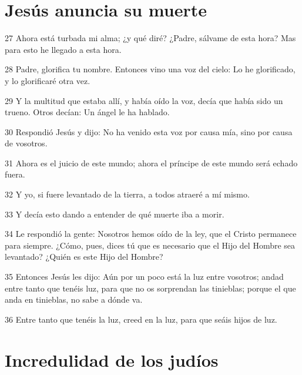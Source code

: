 \section*{Jesús anuncia su muerte}

\par 27 Ahora está turbada mi alma; ¿y qué diré? ¿Padre, sálvame de esta hora? Mas para esto he llegado a esta hora.
\par 28 Padre, glorifica tu nombre. Entonces vino una voz del cielo: Lo he glorificado, y lo glorificaré otra vez.
\par 29 Y la multitud que estaba allí, y había oído la voz, decía que había sido un trueno. Otros decían: Un ángel le ha hablado.
\par 30 Respondió Jesús y dijo: No ha venido esta voz por causa mía, sino por causa de vosotros.
\par 31 Ahora es el juicio de este mundo; ahora el príncipe de este mundo será echado fuera.
\par 32 Y yo, si fuere levantado de la tierra, a todos atraeré a mí mismo.
\par 33 Y decía esto dando a entender de qué muerte iba a morir.
\par 34 Le respondió la gente: Nosotros hemos oído de la ley, que el Cristo permanece para siempre. ¿Cómo, pues, dices tú que es necesario que el Hijo del Hombre sea levantado? ¿Quién es este Hijo del Hombre?
\par 35 Entonces Jesús les dijo: Aún por un poco está la luz entre vosotros; andad entre tanto que tenéis luz, para que no os sorprendan las tinieblas; porque el que anda en tinieblas, no sabe a dónde va.
\par 36 Entre tanto que tenéis la luz, creed en la luz, para que seáis hijos de luz.

\section*{Incredulidad de los judíos}

